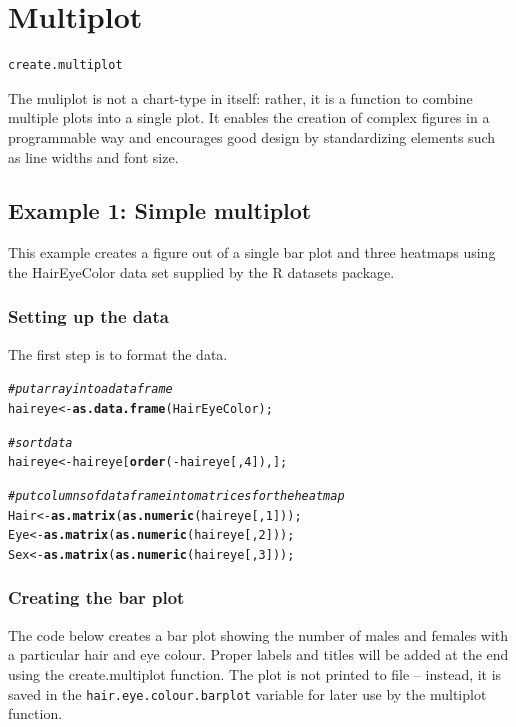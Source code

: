 \documentclass[letterpaper]{article}\usepackage[]{graphicx}\usepackage[]{color}
\makeatletter
\newcommand{\hlnum}[1]{\textcolor[rgb]{0.686,0.059,0.569}{#1}}%
\newcommand{\hlcom}[1]{\textcolor[rgb]{0.678,0.584,0.686}{\textit{#1}}}%
\newcommand{\hlopt}[1]{\textcolor[rgb]{0,0,0}{#1}}%
\newcommand{\hlstd}[1]{\textcolor[rgb]{0.345,0.345,0.345}{#1}}%
\newcommand{\hlkwb}[1]{\textcolor[rgb]{0.69,0.353,0.396}{#1}}%
\newcommand{\hlkwd}[1]{\textcolor[rgb]{0.737,0.353,0.396}{\textbf{#1}}}%
\newenvironment{kframe}{%
 \def\at@end@of@kframe{}%
 \ifinner\ifhmode%
  \def\at@end@of@kframe{\end{minipage}}%
  \begin{minipage}{\columnwidth}%
 \fi\fi%
 \def\FrameCommand##1{\hskip\@totalleftmargin \hskip-\fboxsep
 \colorbox{shadecolor}{##1}\hskip-\fboxsep
     \hskip-\linewidth \hskip-\@totalleftmargin \hskip\columnwidth}%
 \MakeFramed {\advance\hsize-\width
   \@totalleftmargin\z@ \linewidth\hsize
   \@setminipage}}%
 {\par\unskip\endMakeFramed%
 \at@end@of@kframe}
\newenvironment{knitrout}{}{} %
\makeatother
\begin{document}
\section{Multiplot}
\begin{verbatim}
create.multiplot
\end{verbatim}

The muliplot is not a chart-type in itself: rather, it is a function to combine multiple plots into a single plot. It enables the creation of complex figures in a programmable way and encourages good design by standardizing elements such as line widths and font size. 

\subsection{Example 1: Simple multiplot}
This example creates a figure out of a single bar plot and three heatmaps using the HairEyeColor data set supplied by the R datasets package.

\subsubsection{Setting up the data}
The first step is to format the data. 

\begin{knitrout}
\color{fgcolor}\begin{kframe}
\begin{alltt}
\hlcom{# put array into a data frame }
\hlstd{haireye} \hlkwb{<-} \hlkwd{as.data.frame}\hlstd{(HairEyeColor);}

\hlcom{# sort data}
\hlstd{haireye} \hlkwb{<-} \hlstd{haireye[}\hlkwd{order}\hlstd{(}\hlopt{-}\hlstd{haireye[,}\hlnum{4}\hlstd{]),];}

\hlcom{# put columns of data frame into matrices for the heatmap}
\hlstd{Hair} \hlkwb{<-} \hlkwd{as.matrix}\hlstd{(}\hlkwd{as.numeric}\hlstd{(haireye[,}\hlnum{1}\hlstd{]));}
\hlstd{Eye} \hlkwb{<-} \hlkwd{as.matrix}\hlstd{(}\hlkwd{as.numeric}\hlstd{(haireye[,}\hlnum{2}\hlstd{]));}
\hlstd{Sex} \hlkwb{<-} \hlkwd{as.matrix}\hlstd{(}\hlkwd{as.numeric}\hlstd{(haireye[,}\hlnum{3}\hlstd{]));}
\end{alltt}
\end{kframe}
\end{knitrout}

\subsubsection{Creating the bar plot}
The code below creates a bar plot showing the number of males and females with a particular hair and eye colour. Proper labels and titles will be added at the end using the create.multiplot function. The plot is not printed to file -- instead, it is saved in the \verb|hair.eye.colour.barplot| variable for later use by the multiplot function.
\end{document}
